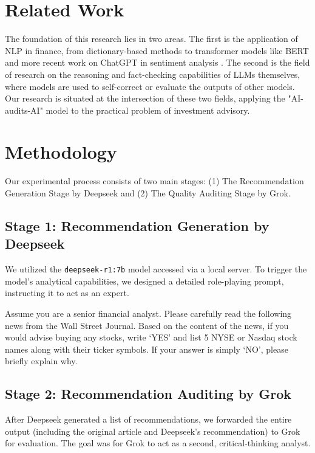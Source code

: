 \documentclass{article}
\begin{document}
\section{Related Work}

The foundation of this research lies in two areas. The first is the application of NLP in finance, from dictionary-based methods \citep{loughran2011} to transformer models like BERT and more recent work on ChatGPT in sentiment analysis \citep{fang2023chatgpt}. The second is the field of research on the reasoning and fact-checking capabilities of LLMs themselves, where models are used to self-correct or evaluate the outputs of other models. Our research is situated at the intersection of these two fields, applying the "AI-audits-AI" model to the practical problem of investment advisory.

\section{Methodology}

Our experimental process consists of two main stages: (1) The Recommendation Generation Stage by Deepseek and (2) The Quality Auditing Stage by Grok.

\subsection{Stage 1: Recommendation Generation by Deepseek}

We utilized the \texttt{deepseek-r1:7b} model accessed via a local server. To trigger the model's analytical capabilities, we designed a detailed role-playing prompt, instructing it to act as an expert.

\begin{promptbox}[title={Prompt sent to Deepseek}]
Assume you are a senior financial analyst. Please carefully read the following news from the Wall Street Journal. Based on the content of the news, if you would advise buying any stocks, write ‘YES’ and list 5 NYSE or Nasdaq stock names along with their ticker symbols. If your answer is simply ‘NO’, please briefly explain why.
\end{promptbox}

\subsection{Stage 2: Recommendation Auditing by Grok}

After Deepseek generated a list of recommendations, we forwarded the entire output (including the original article and Deepseek's recommendation) to Grok for evaluation. The goal was for Grok to act as a second, critical-thinking analyst.
\end{document}
